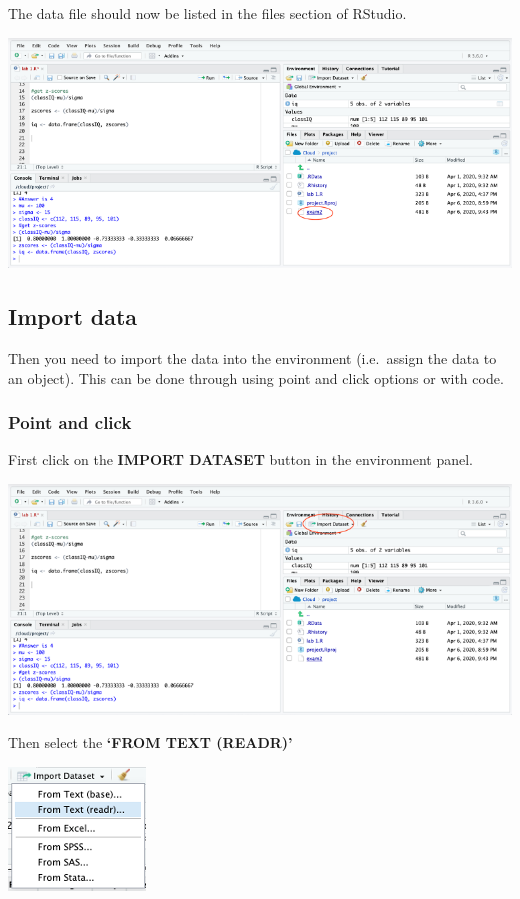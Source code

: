\documentclass[
]{book}
\begin{document}
The data file should now be listed in the files section of RStudio.

\includegraphics{img/filelist.png}

\hypertarget{import-data}{%
\subsection{Import data}\label{import-data}}

Then you need to import the data into the environment (i.e.~assign the data to an object). This can be done through using point and click options or with code.

\hypertarget{point-and-click}{%
\subsubsection{Point and click}\label{point-and-click}}

First click on the \textbf{IMPORT DATASET} button in the environment panel.

\includegraphics{img/import.png}

Then select the \textbf{`FROM TEXT (READR)'}

\includegraphics{img/readrbox.png}
\end{document}
